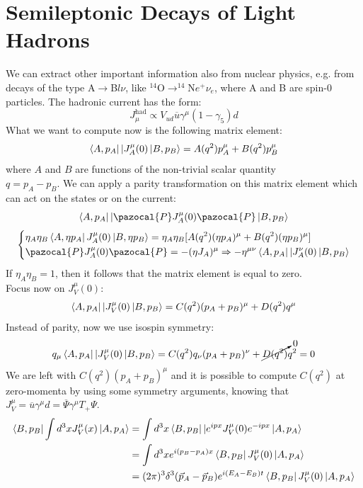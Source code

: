 \documentclass[../main.tex]{subfiles}
\begin{document}
\section{Semileptonic Decays of Light Hadrons}
We can extract other important information also from nuclear physics, e.g. from decays of the type A$\to$B$l\nu$, like $^{14}$O$\to^{14}$N$e^+\nu_e$, where A and B are spin-0 particles. The hadronic current has the form:
\[
J_\mu^{\text{had}}\propto V_{ud}\overline{u}\gamma^\mu(1-\gamma_5)d
\]
What we want to compute now is the following matrix element:
\[
\bra{A,p_A}|J_A^\mu(0)\ket{B,p_B}=A(q^2)p_A^\mu+B(q^2)p_B^\mu
\]
where $A$ and $B$ are functions of the non-trivial scalar quantity\\
$q=p_A-p_B$. We can apply a parity transformation on this matrix element which can act on the states or on the current:
\[
\bra{A,p_A}|\pazocal{P}J_A^\mu(0)\pazocal{P}\ket{B,p_B}
\]
\[
\left\{
\begin{aligned}
&\eta_A\eta_B\bra{A,\eta p_A}J_A^\mu(0)\ket{B,\eta p_B}=\eta_A\eta_B[A(q^2)(\eta p_A)^\mu+B(q^2)(\eta p_B)^\mu]\\
&\pazocal{P}J_A^\mu(0)\pazocal{P}=-(\eta J_A)^\mu\Rightarrow-\eta^{\mu\nu}\bra{A,p_A}|J_A^\nu(0)\ket{B,p_B}
\end{aligned}
\right.
\]
If $\eta_A\eta_B=1$, then it follows that the matrix element is equal to zero.\\
Focus now on $J_V^\mu(0)$:
\[
\bra{A,p_A}|J_V^\mu(0)\ket{B,p_B}=C(q^2)(p_A+p_B)^\mu+D(q^2)q^\mu
\]
Instead of parity, now we use isospin symmetry:
\[
q_\mu\bra{A,p_A}|J_V^\mu(0)\ket{B,p_B}=C(q^2)q_\nu(p_A+p_B)^\nu+\cancelto{0}{D(q^2)}q^2=0
\]
We are left with $C(q^2)(p_A+p_B)^\mu$ and it is possible to compute $C(q^2)$ at zero-momenta by using some symmetry arguments, knowing that $J_V^\mu=\overline{u}\gamma^\mu d=\overline{\Psi}\gamma^\mu T_+\Psi$.
\begin{align*}
\bra{B,p_B}\int d^3xJ_V^\mu(x)\ket{A,p_A}&=\int d^3x\bra{B,p_B}|e^{ipx}J_V^\mu(0)e^{-ipx}\ket{A,p_A}\\
&=\int d^3xe^{i(p_B-p_A)x}\bra{B,p_B}J_V^\mu(0)\ket{A,p_A}\\
&=(2\pi)^3\delta^3(\Vec{p}_A-\Vec{p}_B)e^{i(E_A-E_B)t}\bra{B,p_B}J_V^\mu(0)\ket{A,p_A}
\end{align*}
\end{document}
